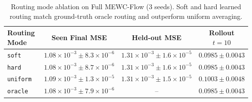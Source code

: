 \documentclass[11pt,a4paper]{article}
\begin{document}
\begin{table}[!htbp]
\centering
\caption{Routing mode ablation on Full MEWC-Flow (3 seeds). Soft and hard learned routing match ground-truth oracle routing and outperform uniform averaging.}
\label{tab:routing_modes}
\begin{tabular}{@{}lccc@{}}
\toprule
Routing Mode & Seen Final MSE & Held-out MSE & Rollout $t=10$ \\
\midrule
\texttt{soft} & $1.08 \times 10^{-3} \pm 8.3 \times 10^{-6}$ & $1.31 \times 10^{-3} \pm 1.6 \times 10^{-5}$ & $0.0985 \pm 0.0043$ \\
\texttt{hard} & $1.08 \times 10^{-3} \pm 8.7 \times 10^{-6}$ & $1.31 \times 10^{-3} \pm 1.6 \times 10^{-5}$ & $0.0985 \pm 0.0043$ \\
\texttt{uniform} & $1.09 \times 10^{-3} \pm 1.3 \times 10^{-5}$ & $1.31 \times 10^{-3} \pm 1.5 \times 10^{-5}$ & $0.1003 \pm 0.0048$ \\
\texttt{oracle} & $1.08 \times 10^{-3} \pm 7.9 \times 10^{-6}$ & -- & $0.0985 \pm 0.0043$ \\
\bottomrule
\end{tabular}
\end{table}

\begin{table}[!htbp]
\centering
\caption{Task-order sensitivity across ascending ($240 \to 2520$), descending ($2520 \to 240$), and shuffled ($1280 \to 240 \to 2520 \to 650$) curricula (RQ5, 3 seeds, Avg.\ Forgetting / Final MSE).}
\label{tab:order}
\end{table}
\end{document}
